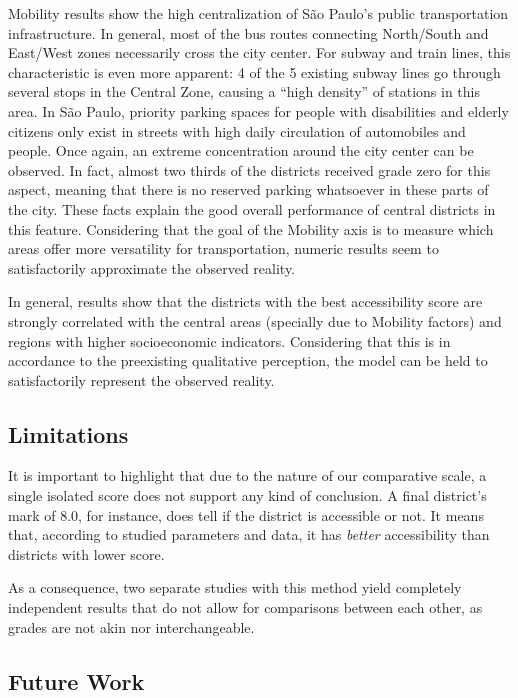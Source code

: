 \documentclass[12pt]{article}
\begin{document}
Mobility results show the high centralization of São Paulo's public transportation infrastructure.
In general,
most of the bus routes connecting North/South and East/West zones
necessarily cross the city center.
For subway and train lines, this characteristic is even more apparent:
4 of the 5 existing subway lines go through several stops in the Central Zone,
causing a ``high density'' of stations in this area.
In São Paulo, priority parking spaces for people with disabilities and elderly citizens
only exist in streets with high daily circulation of automobiles and people.
Once again, an extreme concentration around the city center can be observed.
In fact, almost two thirds of the districts received grade zero for this aspect,
meaning that there is no reserved parking whatsoever in these parts of the city.
These facts explain the good overall performance of central districts in this feature.
Considering that the goal of the Mobility axis is to measure which areas offer more versatility for transportation,
numeric results seem to satisfactorily approximate the observed reality.

In general, results show that the districts with the best accessibility score
are strongly correlated with the central areas (specially due to Mobility factors)
and regions with higher socioeconomic indicators.
Considering that this is in accordance to the preexisting qualitative perception,
the model can be held to satisfactorily represent the observed reality.

\subsection{Limitations}
\label{sub:limitations}

It is important to highlight that due to the nature of our comparative scale,
a single isolated score does not support any kind of conclusion.
A final district's mark of $8.0$, for instance,
does tell if the district is accessible or not.
It means that, according to studied parameters and data,
it has \emph{better} accessibility than districts with lower score.

As a consequence, two separate studies with this method
yield completely independent results
that do not allow for comparisons between each other,
as grades are not akin nor interchangeable.

\subsection{Future Work}
\label{sub:future}
\end{document}
